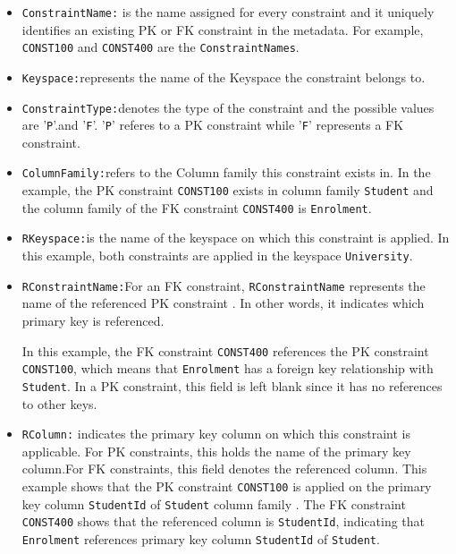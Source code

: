 \begin{itemize}
  
  \item \texttt{ConstraintName:} is the name assigned for
  every constraint and it uniquely identifies an
  existing \ac{PK} or \ac{FK} constraint in the metadata. 
  For example,  \texttt{CONST100} and \texttt{CONST400} are the \texttt{ConstraintNames}. 
  
  \item \texttt{Keyspace:}represents the name of the Keyspace the constraint
  belongs to. 
  
  \item \texttt{ConstraintType:}denotes the type of the constraint and the
  possible values are '\texttt{P}'.and '\texttt{F}'.
  '\texttt{P}' referes to  a \ac{PK} constraint while '\texttt{F}' represents  a
   \ac{FK} constraint. 
   
  \item \texttt{ColumnFamily:}refers to the Column family this constraint
  exists in. 
  In the example,  the \ac{PK} constraint
  \texttt{CONST100}  exists in column family \texttt{Student} and the column
  family of the \ac{FK} constraint \texttt{CONST400}
  is \texttt{Enrolment}.
  
  \item \texttt{RKeyspace:}is the name of the keyspace on which this constraint
  is applied.  In this example,  both constraints
  are applied in  the keyspace \texttt{University}.  
  
    
  \item \texttt{RConstraintName:}For an \ac{FK}
  constraint,  \texttt{RConstraintName} represents the name of the
  referenced \ac{PK} constraint . In other words, it indicates which primary key
  is referenced.
  
  In this example,  the \ac{FK} constraint \texttt{CONST400} references the
  \ac{PK} constraint \texttt{CONST100},  which means that \texttt{Enrolment} has
  a foreign key relationship with \texttt{Student}.  In a \ac{PK} constraint,  this field is
  left blank since it has no references to other keys.
  
  \item \texttt{RColumn:}  indicates the primary key column on which this
  constraint is applicable.  For \ac{PK} constraints,  this holds the name of
  the primary key column.For \ac{FK} constraints, this field denotes
  the referenced column.  This example shows that the \ac{PK} constraint
  \texttt{CONST100} is applied on the primary key column \texttt{StudentId} of
  \texttt{Student} column family . The \ac{FK} constraint \texttt{CONST400}
  shows that the referenced column is \texttt{StudentId},  indicating that
  \texttt{Enrolment} references primary key column \texttt{StudentId} of \texttt{Student}.
  

\end{itemize}
